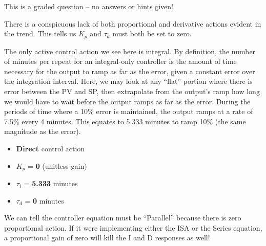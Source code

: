 
This is a graded question -- no answers or hints given!







There is a conspicuous lack of both proportional and derivative actions evident in the trend.  This tells us $K_p$ and $\tau_d$ must both be set to zero.

The only active control action we see here is integral.  By definition, the number of minutes per repeat for an integral-only controller is the amount of time necessary for the output to ramp as far as the error, given a constant error over the integration interval.  Here, we may look at any ``flat'' portion where there is error between the PV and SP, then extrapolate from the output's ramp how long we would have to wait before the output ramps as far as the error.  During the periods of time where a 10\% error is maintained, the output ramps at a rate of 7.5\% every 4 minutes.  This equates to 5.333 minutes to ramp 10\% (the same magnitude as the error).

\vskip 10pt

\begin{itemize}
\item{} {\bf Direct} control action
\vskip 10pt
\item{} $K_p$ = {\bf 0} (unitless gain)
\vskip 10pt
\item{} $\tau_i$ = {\bf 5.333} minutes
\vskip 10pt
\item{} $\tau_d$ = {\bf 0} minutes
\end{itemize}

\vskip 10pt

We can tell the controller equation must be ``Parallel'' because there is zero proportional action.  If it were implementing either the ISA or the Series equation, a proportional gain of zero will kill the I and D responses as well!




